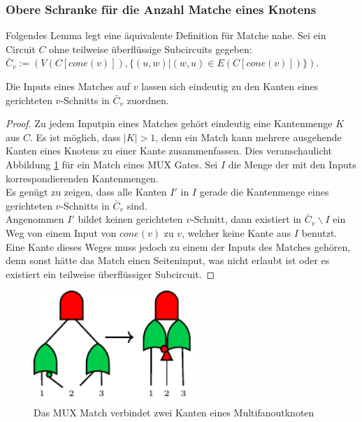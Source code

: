 \documentclass[11pt, a4paper, german]{article}
\begin{document}
\subsubsection{Obere Schranke für die Anzahl Matche eines Knotens}
\label{subsubsec:anzahl_matchings}
Folgendes Lemma legt eine äquivalente Definition für Matche nahe.
Sei ein Circuit $C$ ohne teilweise überflüssige Subcircuits gegeben: \\$\bar{C}_v := (V(C[cone(v)]), \{ (u,w) | (w,u) \in E(C[cone(v)])\})$.
\begin{lemma}{Die Inputs eines Matches auf $v$ lassen sich eindeutig zu den Kanten eines gerichteten $v$-Schnitts in $\bar{C}_v $} zuordnen.
\end{lemma}
\begin{proof}
Zu jedem Inputpin eines Matches gehört eindeutig eine Kantenmenge $K$ aus $C$. Es ist möglich, dass $|K| > 1$, denn ein Match kann mehrere ausgehende Kanten eines Knotens zu einer Kante zusammenfassen. Dies veranschaulicht Abbildung \ref{bild:mux_match} für ein Match eines MUX Gates.  Sei $I$ die Menge der mit den Inputs korrespondierenden Kantenmengen.\\
Es genügt zu zeigen, dass alle Kanten $I'$ in $I$ gerade die Kantenmenge eines gerichteten $v$-Schnitts in $\bar{C}_v$ sind. \\
Angenommen $I'$ bildet keinen gerichteten $v$-Schnitt, dann existiert in $\bar{C}_v\backslash I$ ein Weg von einem Input von $cone(v)$ zu $v$, welcher keine Kante aus $I$ benutzt. \\
Eine Kante dieses Weges muss jedoch zu einem der Inputs des Matches gehören, denn sonst hätte das Match einen Seiteninput, was nicht erlaubt ist oder es existiert ein teilweise überflüssiger Subcircuit. 
\end{proof}

\begin{figure}
		\includegraphics[width = 6cm]{pictures/compiled/mux_match}
		\caption{Das MUX Match verbindet zwei Kanten eines Multifanoutknoten}
		\label{bild:mux_match}
\end{figure}
\end{document}
